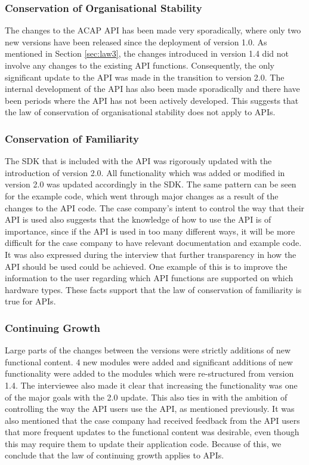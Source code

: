 \documentclass{sig-alternate}
\begin{document}
\subsubsection{Conservation of Organisational Stability}
The changes to the ACAP API has been made very sporadically, where only two new versions have been released since the deployment of version 1.0. As mentioned in Section \ref{sec:law3}, the changes introduced in version 1.4 did not involve any changes to the existing API functions. Consequently, the only significant update to the API was made in the transition to version 2.0. The internal development of the API has also been made sporadically and there have been periods where the API has not been actively developed. This suggests that the law of conservation of organisational stability does not apply to APIs. 

\subsubsection{Conservation of Familiarity}
The SDK that is included with the API was rigorously updated with the introduction of version 2.0. All functionality which was added or modified in version 2.0 was updated accordingly in the SDK. The same pattern can be seen for the example code, which went through major changes as a result of the changes to the API code. The case company's intent to control the way that their API is used also suggests that the knowledge of how to use the API is of importance, since if the API is used in too many different ways, it will be more difficult for the case company to have relevant documentation and example code. It was also expressed during the interview that further transparency in how the API should be used could be achieved. One example of this is to improve the information to the user regarding which API functions are supported on which hardware types. These facts support that the law of conservation of familiarity is true for APIs. 

\subsubsection{Continuing Growth}
Large parts of the changes between the versions were strictly additions of new functional content. 4 new modules were added and significant additions of new functionality were added to the modules which were re-structured from version 1.4. The interviewee also made it clear that increasing the functionality was one of the major goals with the 2.0 update. This also ties in with the ambition of controlling the way the API users use the API, as mentioned previously. It was also mentioned that the case company had received feedback from the API users that more frequent updates to the functional content was desirable, even though this may require them to update their application code. Because of this, we conclude that the law of continuing growth applies to APIs. 
\end{document}
